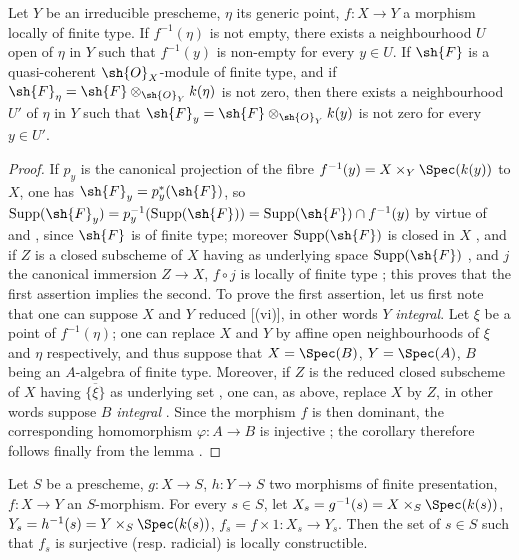 \begin{corollary}[1.8.6]
\label{IV.1.8.6}
Let $Y$ be an irreducible prescheme, $\eta$ its generic point, $f:X\to Y$ a morphism locally of finite type.
If $f^{-1}(\eta)$ is not empty, there exists a neighbourhood $U$ open of $\eta$ in $Y$ such that $f^{-1}(y)$ is non-empty for every $y\in U$.
If $\sh{F}$ is a quasi-coherent $\sh{O}_X$-module of finite type, and if $\sh{F}_\eta=\sh{F}\otimes_{\sh{O}_Y} k(\eta)$ is not zero, then there exists a neighbourhood $U'$ of $\eta$ in $Y$ such that $\sh{F}_y=\sh{F}\otimes_{\sh{O}_Y} k(y)$ is not zero for every $y\in U'$.
\end{corollary}

\begin{proof}
If $p_y$ is the canonical projection of the fibre $f^{-1}(y)=X\times_Y\Spec(k(y))$ to $X$, one has $\sh{F}_y=p_y^*(\sh{F})$, so $\mathrm{Supp}(\sh{F}_y)=p_y^{-1}(\mathrm{Supp}(\sh{F}))=\mathrm{Supp}(\sh{F})\cap f^{-1}(y)$ by virtue of  and , since $\sh{F}$ is of finite type; moreover $\mathrm{Supp}(\sh{F})$ is closed in $X$ , and if $Z$ is a closed subscheme of $X$ having as underlying space $\mathrm{Supp}(\sh{F})$ , and $j$ the canonical immersion $Z\to X$, $f\circ j$ is locally of finite type ; this proves that the first assertion implies the second.
To prove the first assertion, let us first note that one can suppose $X$ and $Y$ reduced [(vi)], in other words $Y$ \emph{integral}.
Let $\xi$ be a point of $f^{-1}(\eta)$; one can replace $X$ and $Y$ by affine open neighbourhoods of $\xi$ and $\eta$ respectively, and thus suppose that $X=\Spec(B)$, $Y=\Spec(A)$, $B$ being an $A$-algebra of finite type.
Moreover, if $Z$ is the reduced closed subscheme of $X$ having $\overline{\{\xi\}}$ as underlying set , one can, as above, replace $X$ by $Z$, in other words suppose $B$ \emph{integral} .
Since the morphism $f$ is then dominant, the corresponding homomorphism $\varphi:A\to B$ is injective ; the corollary therefore follows finally from the lemma .
\end{proof}

\begin{proposition}[1.8.7]
\label{IV.1.8.7}
Let $S$ be a prescheme, $g:X\to S$, $h:Y\to S$ two morphisms of finite presentation, $f:X\to Y$ an $S$-morphism.
For every $s\in S$, let $X_s=g^{-1}(s)=X\times_S\Spec(k(s))$, $Y_s=h^{-1}(s)=Y\times_S\Spec(k(s))$, $f_s=f\times 1:X_s\to Y_s$.
Then the set of $s\in S$ such that $f_s$ is surjective (resp. radicial) is locally constructible.
\end{proposition}

